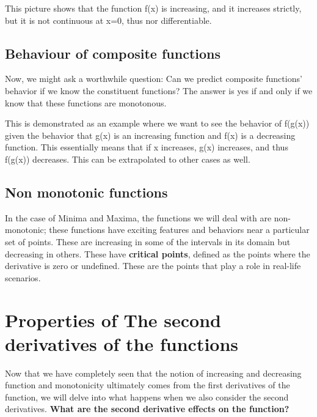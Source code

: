 
This picture shows that the function f(x) is increasing, and it increases strictly, but it is not continuous at x=0, thus nor differentiable.

\subsection{Behaviour of composite functions}

Now, we might ask a worthwhile question: Can we predict composite functions' behavior if we know the constituent functions? The answer is yes if and only if we know that these functions are monotonous. 

This is demonstrated as an example where we want to see the behavior of f(g(x)) given the behavior that g(x) is an increasing function and f(x) is a decreasing function.
This essentially means that if x increases, g(x) increases, and thus f(g(x)) decreases. This can be extrapolated to other cases as well. 

\subsection{Non monotonic functions}

In the case of Minima and Maxima, the functions we will deal with are non-monotonic; these functions have exciting features and behaviors near a particular set of points. These are increasing in some of the intervals in its domain but decreasing in others. These have \textbf{critical points}, defined as the points where the derivative is zero or undefined. These are the points that play a role in real-life scenarios.


\section{Properties of The second derivatives of the functions}

Now that we have completely seen that the notion of increasing and decreasing function and monotonicity ultimately comes from the first derivatives of the function, we will delve into what happens when we also consider the second derivatives. \textbf{What are the second derivative effects on the function?} 


